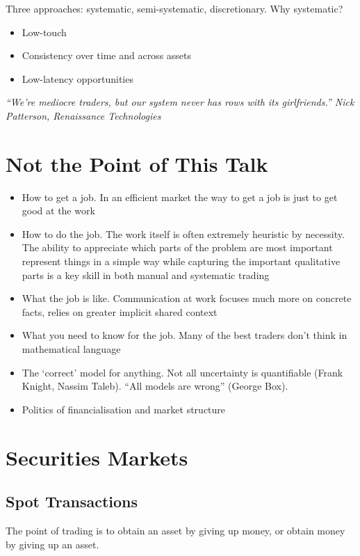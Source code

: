\documentclass{article}
\newcommand{\sectionquote}[1]{\def\insertsquote{#1}}
\newcommand{\insertsquote}{}
\renewcommand{\insertsquote}{}%
\begin{document}
Three approaches: systematic, semi-systematic, discretionary. Why systematic?
\begin{itemize}
	\item Low-touch
	\item Consistency over time and across assets
	\item Low-latency opportunities
\end{itemize}
\textit{``We’re mediocre traders, but our system never has rows with its girlfriends.'' Nick Patterson, Renaissance Technologies}

\section*{Not the Point of This Talk}
\begin{itemize}
	\item How to get a job. In an efficient market the way to get a job is just to get good at the work
	\item How to do the job. The work itself is often extremely heuristic by necessity. The ability to appreciate which parts of the problem are most important represent things in a simple way while capturing the important qualitative parts is a key skill in both manual and systematic trading
	\item What the job is like. Communication at work focuses much more on concrete facts, relies on greater implicit shared context
	\item What you need to know for the job. Many of the best traders don't think in mathematical language
	\item The `correct' model for anything. Not all uncertainty is quantifiable (Frank Knight, Nassim Taleb). ``All models are wrong'' (George Box).
	\item Politics of financialisation and market structure
\end{itemize}

\newpage

\setcounter{tocdepth}{3}
\tableofcontents

\sectionquote{``Governing by the power of virtue can be compared to the pole star, which remains fixed in place while all the other stars orbit respectfully around it.'' Confucius}
\section{Securities Markets}

\subsection{Spot Transactions}
The point of trading is to obtain an asset by giving up money, or obtain money by giving up an asset.
\end{document}

